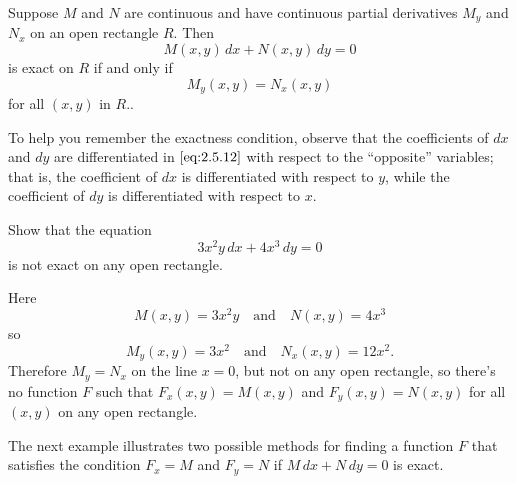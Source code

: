 \documentclass{ximera}
\begin{document}
\begin{theorem}\label{thmtype:2.5.2}
Suppose  $M$ and
$N$ are continuous and have continuous partial derivatives
$M_y$ and $N_x$ on an open rectangle $R.$ Then
$$
M(x,y)\,dx+N(x,y)\,dy=0
$$
is exact on $R$ if and only if
\begin{equation} \label{eq:2.5.12}
M_y(x,y)=N_x(x,y)
\end{equation}
for all $(x,y)$ in  $R.$.
\end{theorem}
 
To help you remember the exactness condition, observe
that the coefficients of $dx$ and $dy$ are differentiated in
$\eqref{eq:2.5.12}$ with respect to the ``opposite'' variables; that is,
the coefficient of $dx$ is differentiated with respect to $y$, while the
coefficient of $dy$ is differentiated with respect to $x$.
 
\begin{example}\label{example:2.5.2}
 Show that the equation
$$
3x^2y\,dx+4x^3\,dy=0
$$
is not exact on any open rectangle.
 
\begin{explanation}   Here
$$
M(x,y)=3x^2y\quad\mbox{and}\quad N(x,y)=4x^3
$$
so
$$
M_y(x,y)=3x^2 \quad\mbox{and}\quad N_x(x,y)=12 x^2.
$$
Therefore  $M_y=N_x$   on the line $x=0$,
but not on any open rectangle, so
there's no
function $F$ such that $F_x(x,y)=M(x,y)$ and $F_y(x,y)=N(x,y)$
for all $(x,y)$ on any open rectangle.
\end{explanation}
\end{example}
 
The next example illustrates two possible methods for finding a
function $F$ that satisfies the condition $F_x=M$ and $F_y=N$ if
$M\,dx+N\,dy=0 $ is exact.
 
\end{document}
